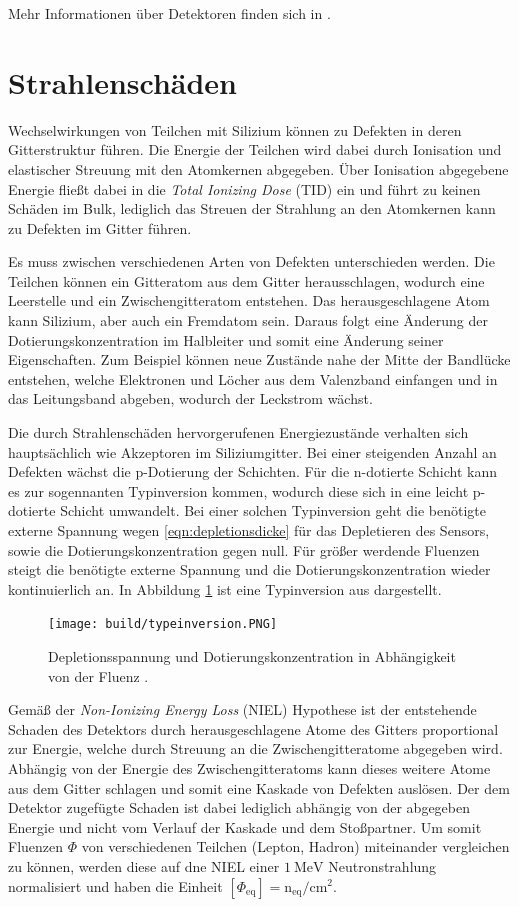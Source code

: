 Mehr Informationen über Detektoren finden sich in  \cite{semiconductor}.

\section{Strahlenschäden}
Wechselwirkungen von Teilchen mit Silizium können zu Defekten in deren
Gitterstruktur führen.
Die Energie der Teilchen wird dabei durch Ionisation und elastischer Streuung mit den Atomkernen abgegeben. Über Ionisation abgegebene Energie
fließt dabei in die
\textit{Total Ionizing Dose} (TID) ein und führt zu keinen Schäden im Bulk, lediglich das Streuen der Strahlung an den
Atomkernen kann zu Defekten im Gitter führen.

Es muss zwischen verschiedenen Arten von Defekten unterschieden werden. Die Teilchen können ein Gitteratom aus dem
Gitter herausschlagen, wodurch eine Leerstelle und ein Zwischengitteratom entstehen. Das herausgeschlagene Atom
kann Silizium, aber auch ein Fremdatom sein. Daraus folgt eine Änderung der Dotierungskonzentration im
Halbleiter und somit eine Änderung seiner Eigenschaften. Zum Beispiel können neue Zustände nahe der Mitte der
Bandlücke entstehen, welche Elektronen und Löcher aus dem Valenzband einfangen  und in das Leitungsband
abgeben, wodurch der Leckstrom wächst.


Die durch Strahlenschäden hervorgerufenen Energiezustände verhalten sich hauptsächlich wie Akzeptoren im Siliziumgitter. Bei
einer steigenden Anzahl an Defekten wächst die p-Dotierung der Schichten. Für die n-dotierte Schicht kann
es zur sogennanten Typinversion kommen, wodurch diese sich in eine leicht p-dotierte Schicht umwandelt. Bei einer
solchen Typinversion
geht die benötigte externe Spannung wegen \ref{eqn:depletionsdicke} für das Depletieren des Sensors,
sowie die Dotierungskonzentration gegen null.
Für größer werdende Fluenzen steigt die benötigte externe Spannung und die
Dotierungskonzentration wieder kontinuierlich an.
In Abbildung \ref{fig:typeinversion} ist eine Typinversion aus \cite{typinversion} dargestellt.

\begin{figure}
  \centering
    \texttt{[image: build/typeinversion.PNG]}
\caption{Depletionsspannung und Dotierungskonzentration in Abhängigkeit von der Fluenz \cite{typinversion}.}
\label{fig:typeinversion}
\end{figure}

Gemäß der \textit{Non-Ionizing Energy Loss} (NIEL) Hypothese ist der entstehende Schaden des Detektors durch
herausgeschlagene Atome des Gitters proportional zur Energie, welche durch Streuung an die Zwischengitteratome abgegeben wird.
Abhängig von der Energie des Zwischengitteratoms kann dieses weitere Atome aus dem Gitter schlagen und somit
eine Kaskade von Defekten auslösen. Der dem Detektor zugefügte Schaden ist dabei
lediglich abhängig von der abgegeben Energie und nicht vom Verlauf der Kaskade und dem Stoßpartner.
Um somit Fluenzen $ \Phi$ von verschiedenen Teilchen (Lepton, Hadron) miteinander vergleichen zu können, werden diese
auf dne NIEL einer $\SI{1}{\mega\eV}$ Neutronstrahlung normalisiert und haben die Einheit $[\Phi_{\mathrm{eq}}]=\mathrm{n_{\mathrm{eq}}/cm^2}$.



